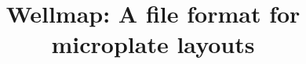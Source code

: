\documentclass{bmcart}
\begin{document}
\begin{frontmatter}

\begin{fmbox}


\title{Wellmap: A file format for microplate layouts}


\author[
   addressref={wyss},                   %
   email={kale@thekunderts.net}         %
]{ }


\address[id=wyss]{%
  ,
  ,
}


\begin{artnotes}
\end{artnotes}


\end{fmbox}
\end{frontmatter}
\end{document}
